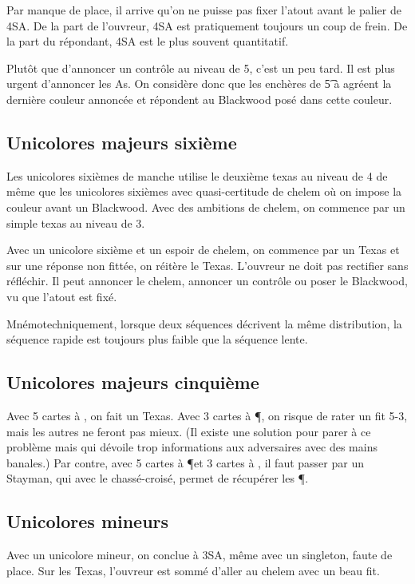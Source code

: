 \documentclass[a4paper,12pt]{article}
\begin{document}
Par manque de place, il arrive qu'on ne puisse pas fixer l'atout avant le palier de 4SA. De la part de l'ouvreur, 4SA est pratiquement toujours un coup de frein.
De la part du répondant, 4SA est le plus souvent quantitatif.

Plutôt que d'annoncer un contrôle au niveau de 5, c'est un peu tard. Il est plus urgent d'annoncer les As. On considère donc que les enchères de \t5 à  agréent la dernière couleur annoncée et répondent au Blackwood posé dans cette couleur.


\subsection*{Unicolores majeurs sixième}

Les unicolores sixièmes de manche utilise le deuxième texas au niveau de 4 de même que les unicolores sixièmes avec quasi-certitude de chelem où on impose la couleur avant un Blackwood. Avec des ambitions de chelem, on commence par un simple texas au niveau de 3.

Avec un unicolore sixième et un espoir de chelem, on commence par un Texas et sur une réponse non fittée, on réitère le Texas. L'ouvreur ne doit pas rectifier sans réfléchir. Il peut annoncer le chelem, annoncer un contrôle ou poser le Blackwood, vu que l'atout est fixé.

Mnémotechniquement, lorsque deux séquences décrivent la même distribution, la séquence rapide est toujours plus faible que la séquence lente.


\subsection*{Unicolores majeurs cinquième}
Avec 5 cartes à \C, on fait un Texas. Avec 3 cartes à \P, on risque de rater un fit 5-3, mais les autres ne feront pas mieux. (Il existe une solution pour parer à ce problème mais qui dévoile trop informations aux adversaires avec des mains banales.)
Par contre, avec 5 cartes à \P et 3 cartes à \C, il faut passer par un Stayman, qui avec le chassé-croisé, permet de récupérer les \P.


\subsection*{Unicolores mineurs}

Avec un unicolore mineur, on conclue à 3SA, même avec un singleton, faute de place. Sur les Texas, l'ouvreur est sommé d'aller au chelem avec un beau fit.
\end{document}
